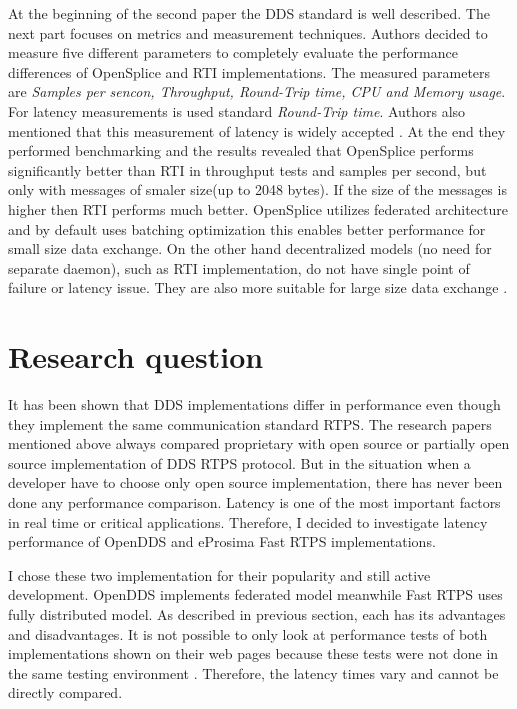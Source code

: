 \documentclass{csfourzero}
\begin{document}
At the beginning of the second paper the DDS standard is well described. The next part focuses on metrics and measurement techniques. Authors decided to measure five different parameters to completely evaluate the performance differences of OpenSplice and RTI implementations. The measured parameters are \textit{Samples per sencon, Throughput, Round-Trip time, CPU and Memory usage}. For latency measurements is used standard \textit{Round-Trip time}. Authors also mentioned that this measurement of latency is widely accepted \cite{perf-embedded}. At the end they performed benchmarking and the results revealed that OpenSplice performs significantly better than RTI in throughput tests and samples per second, but only with messages of smaler size(up to 2048 bytes). If the size of the messages is higher then RTI performs much better. OpenSplice utilizes federated architecture \cite{federated-arch} and by default uses batching optimization this enables better performance for small size data exchange. On the other hand decentralized models (no need for separate daemon), such as RTI implementation, do not have single point of failure or latency issue. They are also more suitable for large size data exchange \cite{splice-vs-rti}.

\section{Research question}
\label{sec:rq}

\quad It has been shown that DDS implementations differ in performance even though they implement the same communication standard RTPS. The research papers mentioned above always compared proprietary with open source or partially open source implementation of DDS RTPS protocol. But in the situation when a developer have to choose only open source implementation, there has never been done any performance comparison. Latency is one of the most important factors in real time or critical applications. Therefore, I decided to investigate latency performance of OpenDDS \cite{git-openDDS} and eProsima Fast RTPS \cite{git-eProsima} implementations. 

I chose these two implementation for their popularity and still active development. OpenDDS implements federated model meanwhile Fast RTPS uses fully distributed model. As described in previous section, each has its advantages and disadvantages. It is not possible to only look at performance tests of both implementations shown on their web pages because these tests were not done in the same testing environment \cite{eProsima-perf, openDDS-perf}. Therefore, the latency times vary and cannot be directly compared.
\end{document}
